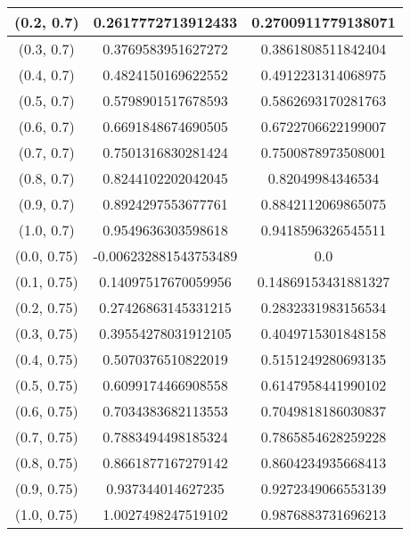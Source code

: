 \begin{table}[H]
\begin{tabular}{|c|c|c|}
(0.2, 0.7) & 0.2617772713912433 & 0.2700911779138071 \\
\hline
(0.3, 0.7) & 0.3769583951627272 & 0.3861808511842404 \\
\hline
(0.4, 0.7) & 0.4824150169622552 & 0.4912231314068975 \\
\hline
(0.5, 0.7) & 0.5798901517678593 & 0.5862693170281763 \\
\hline
(0.6, 0.7) & 0.6691848674690505 & 0.6722706622199007 \\
\hline
(0.7, 0.7) & 0.7501316830281424 & 0.7500878973508001 \\
\hline
(0.8, 0.7) & 0.8244102202042045 & 0.82049984346534 \\
\hline
(0.9, 0.7) & 0.8924297553677761 & 0.8842112069865075 \\
\hline
(1.0, 0.7) & 0.9549636303598618 & 0.9418596326545511 \\
\hline
\hline
(0.0, 0.75) & -0.006232881543753489 & 0.0 \\
\hline
(0.1, 0.75) & 0.14097517670059956 & 0.14869153431881327 \\
\hline
(0.2, 0.75) & 0.27426863145331215 & 0.2832331983156534 \\
\hline
(0.3, 0.75) & 0.39554278031912105 & 0.4049715301848158 \\
\hline
(0.4, 0.75) & 0.5070376510822019 & 0.5151249280693135 \\
\hline
(0.5, 0.75) & 0.6099174466908558 & 0.6147958441990102 \\
\hline
(0.6, 0.75) & 0.7034383682113553 & 0.7049818186030837 \\
\hline
(0.7, 0.75) & 0.7883494498185324 & 0.7865854628259228 \\
\hline
(0.8, 0.75) & 0.8661877167279142 & 0.8604234935668413 \\
\hline
(0.9, 0.75) & 0.937344014627235 & 0.9272349066553139 \\
\hline
(1.0, 0.75) & 1.0027498247519102 & 0.9876883731696213 \\
\hline
\end{tabular}
\end{table}
